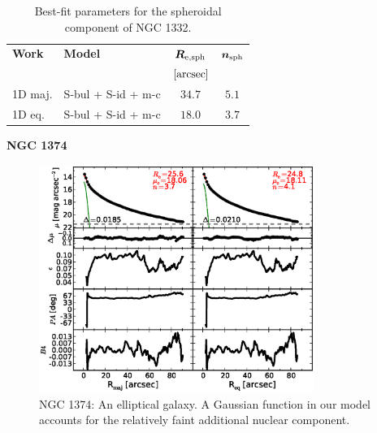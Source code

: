 \documentclass[preprint2]{emulateapj}
\newcommand{\fitfigurewidth}{0.8\textwidth}
\begin{document}
  \begin{table}[h]
  \small
  \caption{Best-fit parameters for the spheroidal component of NGC 1332.}
  \begin{center}
  \begin{tabular}{llcc}
  \hline
  {\bf Work} & {\bf Model}   & $\bm R_{\rm e,sph}$    & $\bm n_{\rm sph}$ \\
    &  &  $[\rm arcsec]$ & \\
  \hline
  1D maj. & S-bul + S-id + m-c & $34.7$  &  $5.1$ \\
  1D eq.  & S-bul + S-id + m-c & $18.0$  &  $3.7$ \\
  \hline
  \end{tabular}
  \end{center}
  \label{tab:n1332}
  \end{table}

  \clearpage\newpage\noindent
  {\bf NGC 1374 \\}

  \begin{figure}[h]
  \begin{center}
  \includegraphics[width=\fitfigurewidth]{images/n1374_1Dfit.eps}
  \caption{NGC 1374: 
  An elliptical galaxy. 
  A Gaussian function in our model accounts for the relatively faint additional nuclear component. 
  }
  \end{center}
  \end{figure}
\end{document}
